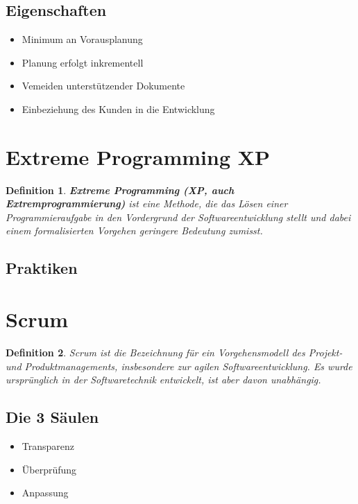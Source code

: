 \documentclass[a4paper]{article}
\theoremstyle{break}
\newtheorem{defi}{Definition}[section]
\begin{document}
        \subsection{Eigenschaften}
        \begin{itemize}
            \item Minimum an Vorausplanung
            \item Planung erfolgt inkrementell
            \item Vemeiden unterstützender Dokumente
            \item Einbeziehung des Kunden in die Entwicklung
        \end{itemize}
        
          
    \section{Extreme Programming XP}
    \begin{defi}
      \textbf{Extreme Programming (XP, auch Extremprogrammierung)} ist eine Methode, die das Lösen einer Programmieraufgabe in den Vordergrund der Softwareentwicklung stellt und dabei einem formalisierten Vorgehen geringere Bedeutung zumisst.
    \end{defi}

    \subsection{Praktiken}
    
    \section{Scrum}
    \begin{defi}
      Scrum ist die Bezeichnung für ein Vorgehensmodell des Projekt- und Produktmanagements, insbesondere zur agilen Softwareentwicklung. Es wurde ursprünglich in der Softwaretechnik entwickelt, ist aber davon unabhängig.
    \end{defi}

    \subsection{Die 3 Säulen}
        \begin{itemize}
            \item Transparenz
            \item Überprüfung
            \item Anpassung
        \end{itemize}
\end{document}
